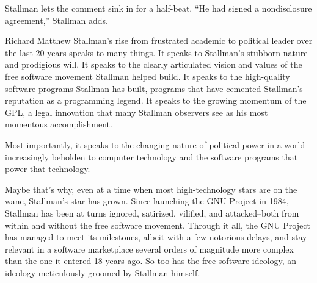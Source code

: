 Stallman lets the comment sink in for a half-beat. ``He had signed a nondisclosure agreement,'' Stallman adds.

Richard Matthew Stallman's rise from frustrated academic to political leader over the last 20 years speaks to many things. It speaks to Stallman's stubborn nature and prodigious will. It speaks to the clearly articulated vision and values of the free software movement Stallman helped build. It speaks to the high-quality software programs Stallman has built, programs that have cemented Stallman's reputation as a programming legend. It speaks to the growing momentum of the GPL, a legal innovation that many Stallman observers see as his most momentous accomplishment.

Most importantly, it speaks to the changing nature of political power in a world increasingly beholden to computer technology and the software programs that power that technology.

Maybe that's why, even at a time when most high-technology stars are on the wane, Stallman's star has grown. Since launching the GNU Project in 1984, Stallman has been at turns ignored, satirized, vilified, and attacked--both from within and without the free software movement. Through it all, the GNU Project has managed to meet its milestones, albeit with a few notorious delays, and stay relevant in a software marketplace several orders of magnitude more complex than the one it entered 18 years ago. So too has the free software ideology, an ideology meticulously groomed by Stallman himself.

